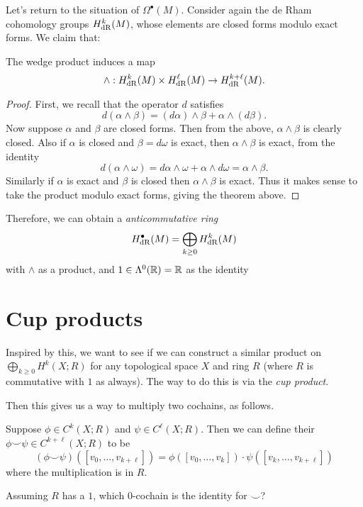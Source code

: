 Let's return to the situation of $\Omega^\bullet(M)$.
Consider again the de Rham cohomology groups $H_{\mathrm{dR}}^k(M)$,
whose elements are closed forms modulo exact forms.
We claim that:
\begin{lemma}
	The wedge product induces a map
	\[ \wedge : H_{\mathrm{dR}}^k(M) \times H_{\mathrm{dR}}^\ell(M) \to H_{\mathrm{dR}}^{k+\ell}(M). \]
\end{lemma}
\begin{proof}
	First, we recall that the operator $d$ satisfies
	\[
		d(\alpha \wedge \beta)
		= (d\alpha) \wedge \beta + \alpha \wedge (d\beta).
	\]
	Now suppose $\alpha$ and $\beta$ are closed forms.
	Then from the above, $\alpha \wedge \beta$ is clearly closed.
	Also if $\alpha$ is closed and $\beta = d\omega$ is exact,
	then $\alpha \wedge \beta$ is exact, from the identity
	\[ d(\alpha \wedge \omega)
		= d\alpha \wedge\omega + \alpha \wedge d\omega = \alpha \wedge \beta. \]
	Similarly if $\alpha$ is exact and $\beta$ is closed
	then $\alpha \wedge \beta$ is exact.
	Thus it makes sense to take the product modulo exact forms,
	giving the theorem above.
\end{proof}

Therefore, we can obtain a \emph{anticommutative ring}
\[ H_{\mathrm{dR}}^\bullet(M) = \bigoplus_{k \ge 0} H_{\mathrm{dR}}^k(M) \]
with $\wedge$ as a product, and $1 \in \Lambda^0(\mathbb R) = \mathbb R$ as the identity

\section{Cup products}
Inspired by this, we want to see if we can construct a similar product
on $\bigoplus_{k \ge 0} H^k(X; R)$ for any topological space $X$ and ring $R$
(where $R$ is commutative with $1$ as always).
The way to do this is via the \emph{cup product}.

Then this gives us a way to multiply two cochains, as follows.
\begin{definition}
	Suppose $\phi \in C^k(X;R)$ and $\psi \in C^\ell(X;R)$.
	Then we can define their 
	$\phi\smile\psi \in C^{k+\ell}(X;R)$ to be
	\[
		(\phi\smile\psi)([v_0, \dots, v_{k+\ell}])
		= 
		\phi\left( [v_0, \dots, v_k] \right)
		\cdot
		\psi\left( [v_k, \dots, v_{k+\ell}] \right)
	\]
	where the multiplication is in $R$.
\end{definition}

\begin{ques}
	Assuming $R$ has a $1$, which $0$-cochain is the identity for $\smile$?
\end{ques}

